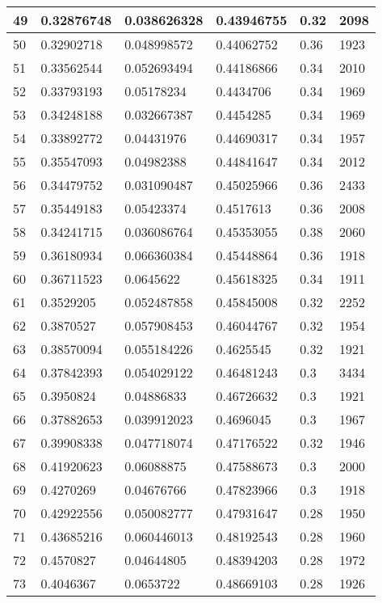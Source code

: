 \begin{longtable}{|l|l|l|l|l|l|}
49 & 0.32876748 & 0.038626328 & 0.43946755 & 0.32 & 2098 \\ \hline 
50 & 0.32902718 & 0.048998572 & 0.44062752 & 0.36 & 1923 \\ \hline 
51 & 0.33562544 & 0.052693494 & 0.44186866 & 0.34 & 2010 \\ \hline 
52 & 0.33793193 & 0.05178234 & 0.4434706 & 0.34 & 1969 \\ \hline 
53 & 0.34248188 & 0.032667387 & 0.4454285 & 0.34 & 1969 \\ \hline 
54 & 0.33892772 & 0.04431976 & 0.44690317 & 0.34 & 1957 \\ \hline 
55 & 0.35547093 & 0.04982388 & 0.44841647 & 0.34 & 2012 \\ \hline 
56 & 0.34479752 & 0.031090487 & 0.45025966 & 0.36 & 2433 \\ \hline 
57 & 0.35449183 & 0.05423374 & 0.4517613 & 0.36 & 2008 \\ \hline 
58 & 0.34241715 & 0.036086764 & 0.45353055 & 0.38 & 2060 \\ \hline 
59 & 0.36180934 & 0.066360384 & 0.45448864 & 0.36 & 1918 \\ \hline 
60 & 0.36711523 & 0.0645622 & 0.45618325 & 0.34 & 1911 \\ \hline 
61 & 0.3529205 & 0.052487858 & 0.45845008 & 0.32 & 2252 \\ \hline 
62 & 0.3870527 & 0.057908453 & 0.46044767 & 0.32 & 1954 \\ \hline 
63 & 0.38570094 & 0.055184226 & 0.4625545 & 0.32 & 1921 \\ \hline 
64 & 0.37842393 & 0.054029122 & 0.46481243 & 0.3 & 3434 \\ \hline 
65 & 0.3950824 & 0.04886833 & 0.46726632 & 0.3 & 1921 \\ \hline 
66 & 0.37882653 & 0.039912023 & 0.4696045 & 0.3 & 1967 \\ \hline 
67 & 0.39908338 & 0.047718074 & 0.47176522 & 0.32 & 1946 \\ \hline 
68 & 0.41920623 & 0.06088875 & 0.47588673 & 0.3 & 2000 \\ \hline 
69 & 0.4270269 & 0.04676766 & 0.47823966 & 0.3 & 1918 \\ \hline 
70 & 0.42922556 & 0.050082777 & 0.47931647 & 0.28 & 1950 \\ \hline 
71 & 0.43685216 & 0.060446013 & 0.48192543 & 0.28 & 1960 \\ \hline 
72 & 0.4570827 & 0.04644805 & 0.48394203 & 0.28 & 1972 \\ \hline 
73 & 0.4046367 & 0.0653722 & 0.48669103 & 0.28 & 1926 \\ \hline 

\end{longtable}
